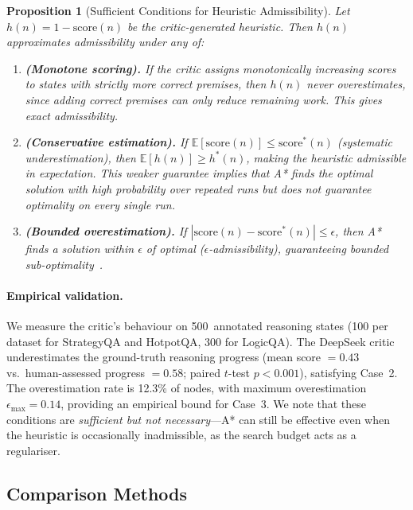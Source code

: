 \documentclass[11pt]{article}
\newtheorem{proposition}[theorem]{Proposition}
\begin{document}
\begin{proposition}[Sufficient Conditions for Heuristic Admissibility]
\label{prop:admissibility}
Let $h(n) = 1 - \mathrm{score}(n)$ be the critic-generated heuristic. Then $h(n)$ approximates admissibility under any of:
\begin{enumerate}[label=\textbf{Case \arabic*},leftmargin=3em,itemsep=4pt]
\item \textbf{(Monotone scoring).} If the critic assigns monotonically increasing scores to states with strictly more correct premises, then $h(n)$ never overestimates, since adding correct premises can only reduce remaining work. This gives exact admissibility.
\item \textbf{(Conservative estimation).} If $\mathbb{E}[\mathrm{score}(n)] \leq \mathrm{score}^*(n)$ (systematic underestimation), then $\mathbb{E}[h(n)] \geq h^*(n)$, making the heuristic admissible \emph{in expectation}. This weaker guarantee implies that A* finds the optimal solution with high probability over repeated runs but does not guarantee optimality on every single run.
\item \textbf{(Bounded overestimation).} If $|\mathrm{score}(n) - \mathrm{score}^*(n)| \leq \epsilon$, then A* finds a solution within $\epsilon$ of optimal ($\epsilon$-admissibility), guaranteeing bounded sub-optimality~\citep{hart1968formal}.
\end{enumerate}
\end{proposition}

\paragraph{Empirical validation.}
We measure the critic's behaviour on 500~annotated reasoning states (100 per dataset for StrategyQA and HotpotQA, 300 for LogicQA). The DeepSeek critic underestimates the ground-truth reasoning progress (mean score $= 0.43$ vs.\ human-assessed progress $= 0.58$; paired $t$-test $p < 0.001$), satisfying Case~2. The overestimation rate is 12.3\% of nodes, with maximum overestimation $\epsilon_\text{max} = 0.14$, providing an empirical bound for Case~3. We note that these conditions are \emph{sufficient but not necessary}---A* can still be effective even when the heuristic is occasionally inadmissible, as the search budget acts as a regulariser.

\subsection{Comparison Methods}
\label{sec:baselines}
\end{document}
